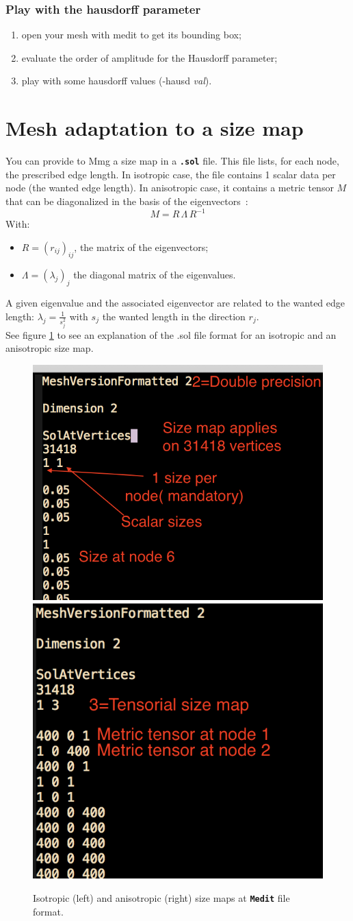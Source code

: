 \documentclass{article}
\newcommand{\ttb}[1]{\texttt{\textbf{#1}}}
\begin{document}
\subsubsection{Play with the hausdorff parameter}
\begin{enumerate}
\item open your mesh with medit to get its bounding box;
\item evaluate the order of amplitude for the Hausdorff parameter;
\item play with some hausdorff values (-hausd \textit{val}).
\end{enumerate}

\section{Mesh adaptation to a size map}
You can provide to Mmg a size map in a \ttb{.sol} file. This file
lists, for each node, the prescribed edge length. In isotropic case,
the file contains 1 scalar data per node (the wanted edge length). In
anisotropic case, it contains a metric tensor $M$ that can be
diagonalized in the basis of the eigenvectors~:
$$
M = R\, \Lambda \, R^{-1}
$$
With:
\begin{itemize}
\item $R = (r_{ij})_{ij}$, the matrix of the eigenvectors;
\item $\Lambda = (\lambda_j)_j$ the diagonal matrix of the eigenvalues.
\end{itemize}
A given eigenvalue and the associated eigenvector are related to the
wanted edge length: $\lambda_j=\frac{1}{s_j^2}$ with $s_j$ the wanted
length in the direction $r_j$.\\

See figure \ref{map} to see an explanation of the .sol file format
for an isotropic and an anisotropic size map.\\

\begin{figure}
\centering
\includegraphics[width=0.4\linewidth]{iso_map}
\includegraphics[width=0.4\linewidth]{aniso_map}
\caption{\label{map}
Isotropic (left) and anisotropic (right) size maps at \ttb{Medit} file format.}
\end{figure}
\end{document}
